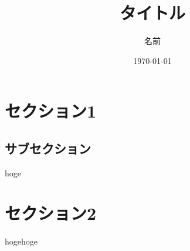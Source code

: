 \documentclass[11pt, a4paper, titlepage]{jarticle}
\title{タイトル}
\author{名前}
\date{\today}
\begin{document}
\maketitle
\tableofcontents
\clearpage

\section{セクション1}

\subsection{サブセクション}
hoge

\section{セクション2}
hogehoge
\end{document}
